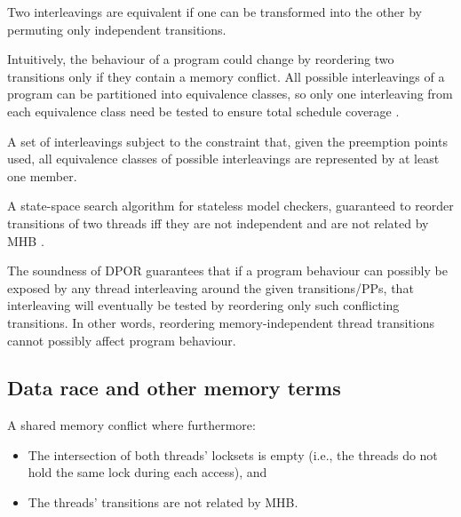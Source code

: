 \begin{definition}
Two interleavings are equivalent if one can be transformed into the other by permuting only independent transitions.
\end{definition}

Intuitively, the behaviour of a program could change by reordering two transitions only if they contain a memory conflict.
All possible interleavings of a program can be partitioned into equivalence classes,
so only one interleaving from each equivalence class need be tested to ensure total schedule coverage \cite{mazurkiewicz}.

\begin{definition}
	A set of interleavings subject to the constraint that, given the preemption points used, all equivalence classes of possible interleavings are represented by at least one member.
\end{definition}

\begin{definition}
	A state-space search algorithm for stateless model checkers,
	guaranteed to reorder transitions of two threads
	iff they are not independent and are not related by MHB \cite{dpor}.
	\label{def:dpor}
\end{definition}

The soundness of DPOR guarantees that if a program behaviour can possibly be exposed by any thread interleaving around the given transitions/PPs,
that interleaving will eventually be tested by reordering only such conflicting transitions.
In other words, reordering memory-independent thread transitions cannot possibly affect program behaviour.

\subsection{Data race and other memory terms}

\begin{definition}
A shared memory conflict where furthermore:
\begin{itemize}
	\item The intersection of both threads' locksets is empty (i.e., the threads do not hold the same lock during each access), and
	\item The threads' transitions are not related by MHB.
\end{itemize}
\end{definition}

